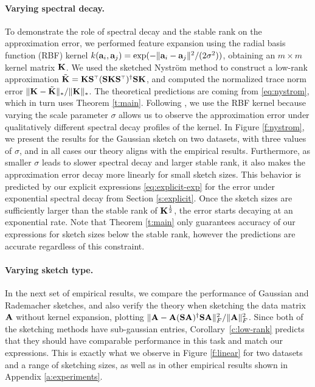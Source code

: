\documentclass[thesis.tex]{subfiles}
\begin{document}
\paragraph{Varying spectral decay.}  To demonstrate the role of spectral
decay and the stable rank on the approximation error, we performed
feature expansion using the radial basis function (RBF) kernel
$k(\mathbf a_i,\mathbf a_j)=\exp(-\|\mathbf a_i-\mathbf a_j\|^2/(2\sigma^2))$, obtaining an $m\times m$
kernel matrix $\mathbf K$. We used the sketched Nystr\"om method to construct
a low-rank approximation $\tilde
\K=\K\S^\top(\S\K\S^\top)^\dagger\S\K$, and computed the normalized trace norm 
error $\|\mathbf K-\tilde{\mathbf K}\|_*/\|\mathbf K\|_*$. The theoretical predictions are coming from
\eqref{eq:nystrom}, which in turn uses Theorem \ref{t:main}.
Following \cite{revisiting-nystrom}, we use the RBF kernel because
varying the scale parameter $\sigma$ 
allows us to observe the approximation error under qualitatively
different spectral decay profiles of the kernel. In Figure \ref{f:nystrom},
we present the results for the Gaussian sketch on two datasets, with three values
of $\sigma$, and in all cases our theory aligns with the empirical
results. Furthermore, as smaller $\sigma$ leads to slower spectral decay and 
larger stable rank, it also makes the approximation error decay more
linearly for small sketch sizes. This behavior is predicted by our explicit
expressions \eqref{eq:explicit-exp} for the error under exponential spectral decay from
Section \ref{s:explicit}. Once the sketch sizes are sufficiently
larger than the stable rank of $\mathbf K^{\frac12}$, the error starts decaying at an
exponential rate. Note that Theorem \ref{t:main} only guarantees
accuracy of our expressions for sketch sizes below the stable rank,
however the predictions are accurate regardless of this constraint.
\vspace{-2mm}
\paragraph{Varying sketch type.} In the next set of
empirical results, we compare the performance of Gaussian and Rademacher
sketches, and also verify the theory when sketching the data matrix $\mathbf A$
without kernel expansion, plotting
$\|\mathbf A-\mathbf A(\mathbf{S}\mathbf A)^\dagger\mathbf{S}\mathbf A\|_F^2/\|\mathbf A\|_F^2$.
Since both of the sketching methods have 
sub-gaussian entries, Corollary~\ref{c:low-rank} predicts that they
should have comparable performance in this task and match our
expressions. This is exactly what we observe in Figure \ref{f:linear}
for two datasets and a range of sketching sizes, as well as in other
empirical results shown in Appendix \ref{a:experiments}.
\end{document}
